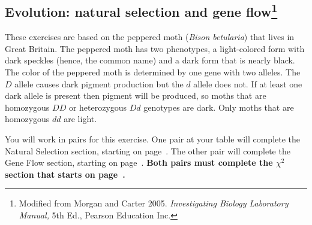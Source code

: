 \documentclass[12pt, hidelinks]{exam}
\newcommand{\allele}[1]{$#1$}
\begin{document}
\subsection*{Evolution: natural selection and gene flow\footnote{Modified from Morgan and Carter 2005. \emph{Investigating Biology Laboratory Manual,} 5th Ed., Pearson Education Inc.}}

These exercises are based on the peppered moth (\textit{Bison betularia}) that lives in Great Britain. The peppered moth has two phenotypes, a light-colored form with dark speckles (hence, the common name) and a dark form that is nearly black. The color of the peppered moth is determined by one gene with two alleles. The \allele{D} allele causes dark pigment production but the \allele{d} allele does not. If at least one dark allele is present then pigment will be produced, so moths that are homozygous \allele{DD} or heterozygous \allele{Dd} genotypes are dark. Only moths that are homozygous \allele{dd} are light. 

You will work in pairs for this exercise. One pair at your table will complete the Natural Selection section, starting on page~\pageref{sec:natural_selection}. The other pair will complete the Gene Flow section, starting on page~\pageref{sec:gene_flow}. \textbf{Both pairs must complete the $\chi^2$ section that starts on page~\pageref{sec:chi_square}.}
\end{document}
